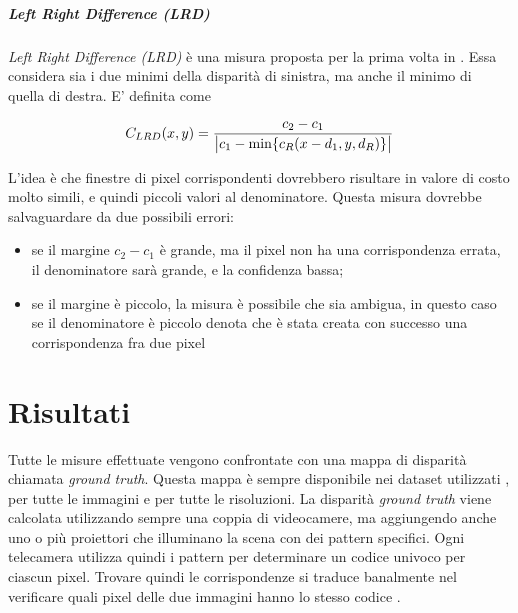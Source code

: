 \documentclass[12pt]{report}
\newcommand{\nullpage}{\newpage\null\thispagestyle{empty}}  %
\DeclarePairedDelimiter{\abs}{\lvert}{\rvert}    %
\begin{document}
			\paragraph{Left Right Difference (LRD)}	
			\label{par:LRD}
			
				\textit{Left Right Difference (LRD)} è una misura proposta per la prima volta in \cite{mordohai_pami}. Essa considera sia i due minimi della disparità di sinistra, ma anche il minimo di quella di destra. E' definita come
				
				\begin{equation}
					C_{LRD}(x,y)=\frac{c_{2}-c_{1}}{\abs[\big]{c_{1}-\min\{c_{R}(x-d_{1},y,d_{R})\}}}
					\label{eq:LRD}
				\end{equation}
				
				\noindent L'idea è che finestre di pixel corrispondenti dovrebbero risultare in valore di costo molto simili, e quindi piccoli valori al denominatore. Questa misura dovrebbe salvaguardare da due possibili errori:
				
				\begin{itemize}
					\item se il margine $c_{2}-c_{1}$ è grande, ma il pixel non ha una corrispondenza errata, il denominatore sarà grande, e la confidenza bassa;
					
					\item se il margine è piccolo, la misura è possibile che sia ambigua, in questo caso se il denominatore è piccolo denota che è stata creata con successo una corrispondenza fra due pixel
					
				\label{item:LRD}	
				\end{itemize}			
				
				\nullpage

	\chapter{Risultati}
	\label{sec:risultati}
	\pagestyle{fancy}				
	
		Tutte le misure effettuate vengono confrontate con una mappa di disparità chiamata \textit{ground truth}. Questa mappa è sempre disponibile nei dataset utilizzati \cite{dataset_2006_1, dataset_2006_2}, per tutte le immagini e per tutte le risoluzioni. La disparità \textit{ground truth} viene calcolata utilizzando sempre una coppia di videocamere, ma aggiungendo anche uno o più proiettori che illuminano la scena con dei pattern specifici. Ogni telecamera utilizza quindi i pattern per determinare un codice univoco per ciascun pixel. Trovare quindi le corrispondenze si traduce banalmente nel verificare quali pixel delle due immagini hanno lo stesso codice \cite{ground_truth}.  			
		
\end{document}
